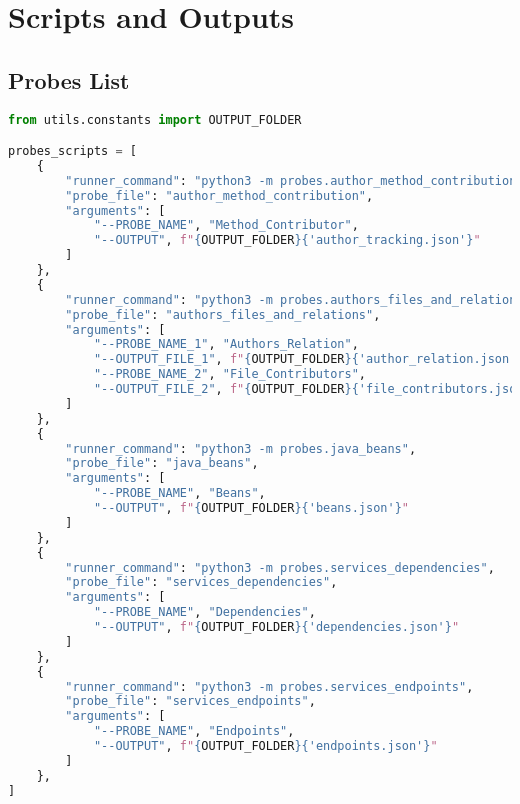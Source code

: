 \chapter{Scripts and Outputs}\label{appendix_a}

\section{Probes List}\label{appendix_sec:probes_list}
\begin{lstlisting}[language=Python]
from utils.constants import OUTPUT_FOLDER

probes_scripts = [
    {
        "runner_command": "python3 -m probes.author_method_contribution",
        "probe_file": "author_method_contribution",
        "arguments": [
            "--PROBE_NAME", "Method_Contributor",
            "--OUTPUT", f"{OUTPUT_FOLDER}{'author_tracking.json'}"
        ]
    },
    {
        "runner_command": "python3 -m probes.authors_files_and_relations",
        "probe_file": "authors_files_and_relations",
        "arguments": [
            "--PROBE_NAME_1", "Authors_Relation",
            "--OUTPUT_FILE_1", f"{OUTPUT_FOLDER}{'author_relation.json'}",
            "--PROBE_NAME_2", "File_Contributors",
            "--OUTPUT_FILE_2", f"{OUTPUT_FOLDER}{'file_contributors.json'}",
        ]
    },
    {
        "runner_command": "python3 -m probes.java_beans",
        "probe_file": "java_beans",
        "arguments": [
            "--PROBE_NAME", "Beans",
            "--OUTPUT", f"{OUTPUT_FOLDER}{'beans.json'}"
        ]
    },
    {
        "runner_command": "python3 -m probes.services_dependencies",
        "probe_file": "services_dependencies",
        "arguments": [
            "--PROBE_NAME", "Dependencies",
            "--OUTPUT", f"{OUTPUT_FOLDER}{'dependencies.json'}"
        ]
    },
    {
        "runner_command": "python3 -m probes.services_endpoints",
        "probe_file": "services_endpoints",
        "arguments": [
            "--PROBE_NAME", "Endpoints",
            "--OUTPUT", f"{OUTPUT_FOLDER}{'endpoints.json'}"
        ]
    },
]
\end{lstlisting}

